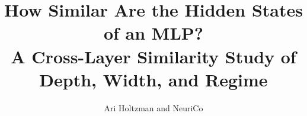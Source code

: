 \documentclass{article}
\title{How Similar Are the Hidden States of an MLP?\\
A Cross-Layer Similarity Study of Depth, Width, and Regime}
\author{Ari Holtzman and NeuriCo}
\begin{document}
\maketitle

\begin{abstract}

\end{abstract}









\end{document}
